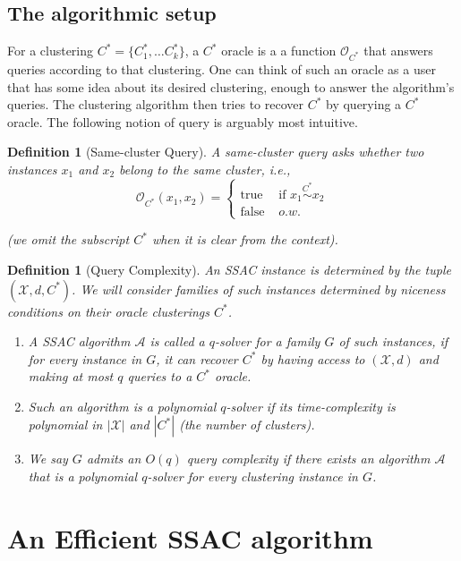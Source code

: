 \documentclass{article}
\newcommand{\mc}{\mathcal}
\newtheorem{definition}[theorem]{Definition}
\begin{document}
\subsection{The algorithmic setup}
For a clustering $C^*=\{ C^*_1, \ldots C^*_k\}$, a $C^*$ oracle is a
a function ${\mc O}_{C^*}$ that answers queries according to that clustering. One can think of such an oracle as a user that has some idea about its desired clustering, enough to answer the algorithm's queries. The clustering algorithm then tries to recover $C^*$ by querying a $C^*$ oracle. The following notion of query is arguably most intuitive.

\begin{definition}[Same-cluster Query]
A same-cluster query asks whether two instances $x_1$ and $x_2$ belong to the same cluster, i.e., 
$${\mc O}_{C^*}(x_1, x_2) = \left\{
	\begin{array}{ll}
		\mbox{true }  & \mbox{if } x_1 \overset{C^*}{\sim} x_2   \\
		\mbox{false } & o.w. 
	\end{array}
\right. $$

(we omit the subscript $C^*$ when it is clear from the context).
\end{definition}


\begin{definition}[Query Complexity]
\label{definition:QueryComplexity}
An SSAC instance is determined by the tuple $(\mc X, d, C^*)$. 
We will consider families of such instances determined by niceness conditions on their oracle clusterings $C^*$.
\begin{enumerate}
\item A SSAC algorithm $\mc A$ is called a $q$-solver for a family $G$ of such instances, if for every instance in $G$, it can recover $C^*$ by having access to $(\mc X, d)$ and making at most $q$ queries to a $C^*$ oracle. 

\item Such an algorithm is a polynomial $q$-solver if its time-complexity is polynomial in $|\mc X|$ and $|C^*|$ (the number of clusters).

\item  We say $G$ admits an $O(q)$ query complexity if there exists an algorithm $\mc A$ that is a polynomial $q$-solver for every clustering instance in $G$.
\end{enumerate}

\end{definition}

\section{An Efficient SSAC algorithm}
\label{section:clusteringWithQuery}
\end{document}
